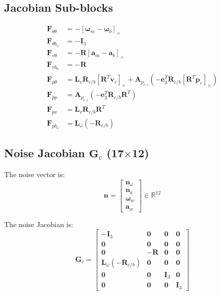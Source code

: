 \documentclass[11pt,a4paper]{article}
\newcommand{\pr}{\mathbf{p}_r}
\newcommand{\vr}{\mathbf{v}_r}
\newcommand{\bgyr}{\bm{\omega}_b}
\newcommand{\bacc}{\mathbf{a}_b}
\newcommand{\R}{\mathbf{R}}
\newcommand{\I}{\mathbf{I}}
\renewcommand{\skew}[1]{\left[#1\right]_\times}
\begin{document}
\subsection{Jacobian Sub-blocks}
\begin{align}
    \mathbf{F}_{\theta\theta} &= -\skew{\bm{\omega}_m - \bgyr} \\[6pt]
    \mathbf{F}_{\theta b_\omega} &= -\I_3 \\[6pt]
    \mathbf{F}_{v\theta} &= -\R \skew{\mathbf{a}_m - \bacc} \\[6pt]
    \mathbf{F}_{v b_a} &= -\R \\[6pt]
    \mathbf{F}_{\bar{p}\theta} &= \mathbf{L}_v \R_{c/b} \skew{\R^T \vr} + \mathbf{A}_{p_{c,z}} \left(-\mathbf{e}_3^T \R_{c/b} \skew{\R^T \pr}\right) \\[6pt]
    \mathbf{F}_{\bar{p}p} &= \mathbf{A}_{p_{c,z}} \left(-\mathbf{e}_3^T \R_{c/b} \R^T\right) \\[6pt]
    \mathbf{F}_{\bar{p}v} &= \mathbf{L}_v \R_{c/b} \R^T \\[6pt]
    \mathbf{F}_{\bar{p}b_\omega} &= \mathbf{L}_\omega (-\R_{c/b})
\end{align}

\subsection{Noise Jacobian $\mathbf{G}_c$ (17$\times$12)}
The noise vector is:
\begin{equation}
    \mathbf{n} = \begin{bmatrix} \mathbf{n}_\omega \\ \mathbf{n}_a \\ \bm{\omega}_w \\ \mathbf{a}_w \end{bmatrix} \in \mathbb{R}^{12}
\end{equation}

The noise Jacobian is:
\begin{equation}
\mathbf{G}_c = \begin{bmatrix}
    -\I_3 & \mathbf{0} & \mathbf{0} & \mathbf{0} \\
    \mathbf{0} & \mathbf{0} & \mathbf{0} & \mathbf{0} \\
    \mathbf{0} & -\R & \mathbf{0} & \mathbf{0} \\
    \mathbf{L}_\omega(-\R_{c/b}) & \mathbf{0} & \mathbf{0} & \mathbf{0} \\
    \mathbf{0} & \mathbf{0} & \I_3 & \mathbf{0} \\
    \mathbf{0} & \mathbf{0} & \mathbf{0} & \I_3
\end{bmatrix}
\end{equation}
\end{document}
